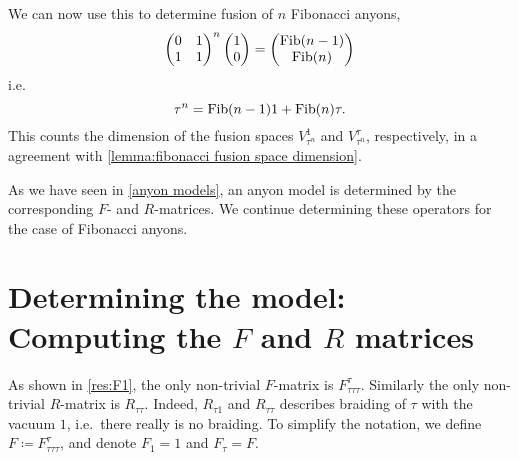 We can now use this to determine fusion of $n$ Fibonacci anyons,
\begin{equation}
  \begin{pmatrix}
    0 & 1 \\
    1 & 1
  \end{pmatrix}^n
  \begin{pmatrix}
    1 \\ 0
  \end{pmatrix} =
  \begin{pmatrix}
    \operatorname{Fib}(n-1) \\ \operatorname{Fib}(n)
  \end{pmatrix}
\end{equation}
i.e.\
\begin{equation}
  \tau^n = \operatorname{Fib}(n-1) 1 + \operatorname{Fib}(n) \tau.
\end{equation}
This counts the dimension of the fusion spaces $V_{\tau^n}^1$ and $V_{\tau^n}^\tau$, respectively, in a agreement with \cref{lemma:fibonacci fusion space dimension}.


As we have seen in \cref{anyon models}, an anyon model is determined by the corresponding $F$- and $R$-matrices. We continue determining these operators for the case of Fibonacci anyons.






\section{Determining the model: Computing the \texorpdfstring{$F$}{F} and \texorpdfstring{$R$}{R} matrices}

As shown in \cref{res:F1}, the only non-trivial $F$-matrix is $F_{τττ}^τ$. Similarly the only non-trivial $R$-matrix is $R_{ττ}$. Indeed, $R_{τ1}$ and $R_{ττ}$ describes braiding of $τ$ with the vacuum $1$, i.e.\ there really is no braiding. To simplify the notation, we define $F ≔ F_{τττ}^τ$, and denote $F_1 = 1$ and $F_τ = F$.

